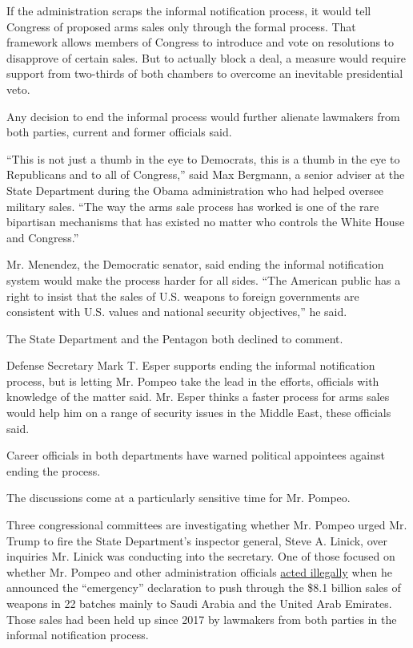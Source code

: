 If the administration scraps the informal notification process, it would
tell Congress of proposed arms sales only through the formal process.
That framework allows members of Congress to introduce and vote on
resolutions to disapprove of certain sales. But to actually block a
deal, a measure would require support from two-thirds of both chambers
to overcome an inevitable presidential veto.

Any decision to end the informal process would further alienate
lawmakers from both parties, current and former officials said.

``This is not just a thumb in the eye to Democrats, this is a thumb in
the eye to Republicans and to all of Congress,'' said Max Bergmann, a
senior adviser at the State Department during the Obama administration
who had helped oversee military sales. ``The way the arms sale process
has worked is one of the rare bipartisan mechanisms that has existed no
matter who controls the White House and Congress.''

Mr. Menendez, the Democratic senator, said ending the informal
notification system would make the process harder for all sides. ``The
American public has a right to insist that the sales of U.S. weapons to
foreign governments are consistent with U.S. values and national
security objectives,'' he said.

The State Department and the Pentagon both declined to comment.

Defense Secretary Mark T. Esper supports ending the informal
notification process, but is letting Mr. Pompeo take the lead in the
efforts, officials with knowledge of the matter said. Mr. Esper thinks a
faster process for arms sales would help him on a range of security
issues in the Middle East, these officials said.

Career officials in both departments have warned political appointees
against ending the process.

The discussions come at a particularly sensitive time for Mr. Pompeo.

Three congressional committees are investigating whether Mr. Pompeo
urged Mr. Trump to fire the State Department's inspector general, Steve
A. Linick, over inquiries Mr. Linick was conducting into the secretary.
One of those focused on whether Mr. Pompeo and other administration
officials
\href{https://www.nytimes.com/2020/05/18/us/politics/pompeo-trump-linick-inspector-general-firing.html}{acted
illegally} when he announced the ``emergency'' declaration to push
through the \$8.1 billion sales of weapons in 22 batches mainly to Saudi
Arabia and the United Arab Emirates. Those sales had been held up since
2017 by lawmakers from both parties in the informal notification
process.

